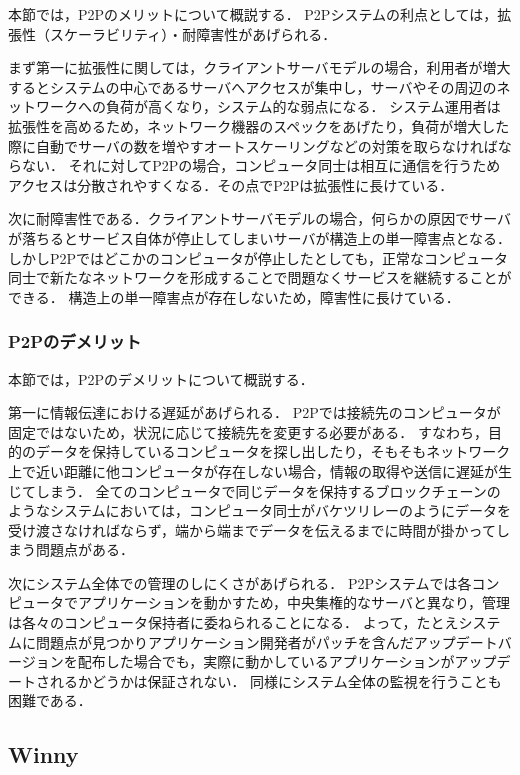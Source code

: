 本節では，P2Pのメリットについて概説する．
P2Pシステムの利点としては，拡張性（スケーラビリティ）・耐障害性があげられる．

まず第一に拡張性に関しては，クライアントサーバモデルの場合，利用者が増大するとシステムの中心であるサーバへアクセスが集中し，サーバやその周辺のネットワークへの負荷が高くなり，システム的な弱点になる．
システム運用者は拡張性を高めるため，ネットワーク機器のスペックをあげたり，負荷が増大した際に自動でサーバの数を増やすオートスケーリングなどの対策を取らなければならない．
それに対してP2Pの場合，コンピュータ同士は相互に通信を行うためアクセスは分散されやすくなる．その点でP2Pは拡張性に長けている．

次に耐障害性である．クライアントサーバモデルの場合，何らかの原因でサーバが落ちるとサービス自体が停止してしまいサーバが構造上の単一障害点となる．
しかしP2Pではどこかのコンピュータが停止したとしても，正常なコンピュータ同士で新たなネットワークを形成することで問題なくサービスを継続することができる．
構造上の単一障害点が存在しないため，障害性に長けている．

\subsubsection{P2Pのデメリット}

本節では，P2Pのデメリットについて概説する．

第一に情報伝達における遅延があげられる．
P2Pでは接続先のコンピュータが固定ではないため，状況に応じて接続先を変更する必要がある．
すなわち，目的のデータを保持しているコンピュータを探し出したり，そもそもネットワーク上で近い距離に他コンピュータが存在しない場合，情報の取得や送信に遅延が生じてしまう．
全てのコンピュータで同じデータを保持するブロックチェーンのようなシステムにおいては，コンピュータ同士がバケツリレーのようにデータを受け渡さなければならず，端から端までデータを伝えるまでに時間が掛かってしまう問題点がある．

次にシステム全体での管理のしにくさがあげられる．
P2Pシステムでは各コンピュータでアプリケーションを動かすため，中央集権的なサーバと異なり，管理は各々のコンピュータ保持者に委ねられることになる．
よって，たとえシステムに問題点が見つかりアプリケーション開発者がパッチを含んだアップデートバージョンを配布した場合でも，実際に動かしているアプリケーションがアップデートされるかどうかは保証されない．
同様にシステム全体の監視を行うことも困難である．

\subsection{Winny}

